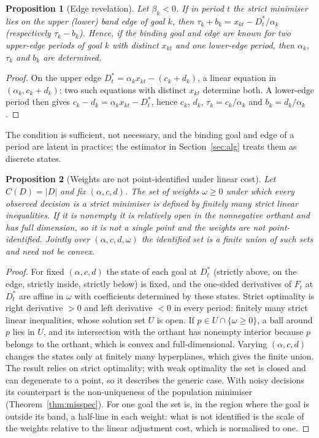 \documentclass[pdflatex,sn-basic]{sn-jnl}
\theoremstyle{thmstyleone}\newtheorem{proposition}{Proposition}\newtheorem{theorem}{Theorem}
\theoremstyle{thmstylethree}\newtheorem{remark}{Remark}
\begin{document}
\begin{proposition}[Edge revelation]\label{prop:edge}
Let $\beta_k<0$. If in period $t$ the strict minimiser lies on the upper (lower) band edge of goal $k$, then $\tau_k+b_k=x_{kt}-D^*_t/\alpha_k$ (respectively $\tau_k-b_k$). Hence, if the binding goal and edge are known for two upper-edge periods of goal $k$ with distinct $x_{kt}$ and one lower-edge period, then $\alpha_k$, $\tau_k$ and $b_k$ are determined.
\end{proposition}
\begin{proof}
On the upper edge $D^*_t=\alpha_kx_{kt}-(c_k+d_k)$, a linear equation in $(\alpha_k,c_k+d_k)$; two such equations with distinct $x_{kt}$ determine both. A lower-edge period then gives $c_k-d_k=\alpha_kx_{kt}-D^*_t$, hence $c_k$, $d_k$, $\tau_k=c_k/\alpha_k$ and $b_k=d_k/\alpha_k$.
\end{proof}
The condition is sufficient, not necessary, and the binding goal and edge of a period are latent in practice; the estimator in Section~\ref{sec:alg} treats them as discrete states.

\begin{proposition}[Weights are not point-identified under linear cost]\label{prop:set}
Let $C(D)=|D|$ and fix $(\alpha,c,d)$. The set of weights $\omega\ge0$ under which every observed decision is a strict minimiser is defined by finitely many strict linear inequalities. If it is nonempty it is relatively open in the nonnegative orthant and has full dimension, so it is not a single point and the weights are not point-identified. Jointly over $(\alpha,c,d,\omega)$ the identified set is a finite union of such sets and need not be convex.
\end{proposition}
\begin{proof}
For fixed $(\alpha,c,d)$ the state of each goal at $D^*_t$ (strictly above, on the edge, strictly inside, strictly below) is fixed, and the one-sided derivatives of $F_t$ at $D^*_t$ are affine in $\omega$ with coefficients determined by these states. Strict optimality is right derivative $>0$ and left derivative $<0$ in every period: finitely many strict linear inequalities, whose solution set $U$ is open. If $p\in U\cap\{\omega\ge0\}$, a ball around $p$ lies in $U$, and its intersection with the orthant has nonempty interior because $p$ belongs to the orthant, which is convex and full-dimensional. Varying $(\alpha,c,d)$ changes the states only at finitely many hyperplanes, which gives the finite union. The result relies on strict optimality; with weak optimality the set is closed and can degenerate to a point, so it describes the generic case. With noisy decisions its counterpart is the non-uniqueness of the population minimiser (Theorem~\ref{thm:misspec}). For one goal the set is, in the region where the goal is outside its band, a half-line in each weight: what is not identified is the scale of the weights relative to the linear adjustment cost, which is normalised to one.
\end{proof}
\end{document}
